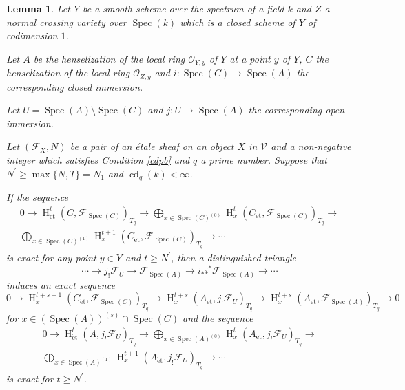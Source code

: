 \documentclass{article}
\newtheorem{lem}[thm]{\indent \sc Lemma}
\newcommand{\spec}{\operatorname{Spec}}
\newcommand{\et}{\mathrm{\acute{e}t}}
\newcommand{\HO}{\operatorname{H}}
\begin{document}
%
\begin{lem}\upshape\label{CAL}
Let $Y$ be a smooth scheme over the spectrum of a field $k$
and $Z$ a normal crossing variety over $\spec(k)$
which is a closed scheme of $Y$ of codimension $1$.

Let $A$ be the henselization of the local ring 
$\mathcal{O}_{Y, y}$ of $Y$ at a point $y$ of $Y$,
$C$ the henselization of the local ring $\mathcal{O}_{Z, y}$
and
$i: \spec (C)\to \spec (A)$ the corresponding closed immersion.

Let $U=\spec(A)\setminus\spec(C)$ and 
$j: U\to\spec(A)$  the corresponding open immersion. 

Let $(\mathcal{F}_{X}, N)$ be a pair of
an \'{e}tale sheaf on an object
$X$ in $\mathcal{V}$ and a non-negative integer
which satisfies Condition \ref{cdpb}
and $q$ a prime number.
Suppose that 
$N^{\prime}\geq \operatorname{max}\{N, T\}=N_{1}$ and
$\operatorname{cd}_{q}(k)<\infty$.

If the sequence
%
\begin{align}\label{AexA}
0\to 
\HO^{t}_{\et}(C, \mathcal{F}_{\spec(C)})_{T_{q }}
\to
\bigoplus_{x\in \spec(C)^{(0)}}
\HO^{t}_{x}(C_{\et}, \mathcal{F}_{\spec(C)})_{T_{q}}
\to  \nonumber
\\
\bigoplus_{x\in \spec(C)^{(1)}}
\HO^{t+1}_{x}(C_{\et}, \mathcal{F}_{\spec(C)})_{T_{q}}
\to\cdots
\end{align}
%
is exact for any point $y\in Y$ and $t\geq N^{\prime}$, then a distinguished triangle
%
\begin{equation}\label{dtji}
\cdots
\to
j_{!}\mathcal{F}_{U}
\to
\mathcal{F}_{\spec(A)}
\to
i_{*}i^{*}\mathcal{F}_{\spec(A)}
\to
\cdots
\end{equation}
%
induces an exact sequence
%
\begin{equation}\label{CA}
0\to  
\HO_{x}^{t+s-1}(C_{\et}, 
\mathcal{F}_{\spec(C)}
)_{T_{q}}
\to
\HO_{x}^{t+s}(A_{\et}, 
j_{!}\mathcal{F}_{U}
)_{T_{q}}
\to
\HO_{x}^{t+s}(A_{\et}, 
\mathcal{F}_{\spec(A)}
)_{T_{q}}
\to
0
\end{equation}
%
for $x\in (\spec(A))^{(s)}\cap \spec(C)$ and the sequence
%
\begin{align}\label{AexC}
0\to
\HO^{t}_{\et}(A, j_{!}\mathcal{F}_{U})_{T_{q}}
\to
\bigoplus_{x\in\spec(A)^{(0)}}
\HO^{t}_{x}(
A_{\et},
j_{!}\mathcal{F}_{U}
)_{T_{q}}
\to  
\nonumber
\\
\bigoplus_{x\in\spec(A)^{(1)}}
\HO^{t+1}_{x}(A_{\et},
j_{!}\mathcal{F}_{U})_{T_{q}}
\to\cdots
\end{align}
%
is exact for $t\geq N^{\prime}$.
\end{lem}
%
\end{document}
